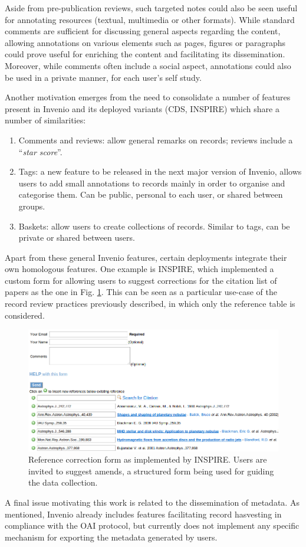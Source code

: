 Aside from pre-publication reviews, such targeted notes could also be seen
useful for annotating resources (textual, multimedia or other formats). While
standard comments are sufficient for discussing general aspects regarding the
content, allowing annotations on various elements such as pages, figures or
paragraphs could prove useful for enriching the content and facilitating its
dissemination. Moreover, while comments often include a social aspect,
annotations could also be used in a private manner, for each user's self study.

Another motivation emerges from the need to consolidate a number of features
present in Invenio and its deployed variants (CDS, INSPIRE) which share a number
of similarities:
\begin{enumerate}
  \item Comments and reviews: allow general remarks on records; reviews include
    a ``\textit{star score}''.
  \item Tags: a new feature to be released in the next major version of Invenio,
    allows users to add small annotations to records mainly in order to
    organise and categorise them. Can be public, personal to each user, or
    shared between groups.
  \item Baskets: allow users to create collections of records. Similar to tags,
    can be private or shared between users.
\end{enumerate}

Apart from these general Invenio features, certain deployments integrate their
own homologous features. One example is INSPIRE, which implemented a custom form
for allowing users to suggest corrections for the citation list of papers as the
one in Fig. \ref{fig:inspire}. This can be seen as a particular use-case of the
record review practices previously described, in which only the reference table
is considered.

\begin{figure}[!h]
  \centering
  \includegraphics[scale=0.5]{static/img/inspire.png}
  \caption[Reference correction form as implemented by INSPIRE.]
          {Reference correction form as implemented by INSPIRE. Users are
           invited to suggest amends, a structured form being used for guiding
           the data collection.}
  \label{fig:inspire}
\end{figure}

A final issue motivating this work is related to the dissemination of metadata.
As mentioned, Invenio already includes features facilitating record hasvesting
in compliance with the OAI protocol, but currently does not implement any
specific mechanism for exporting the metadata generated by users.
